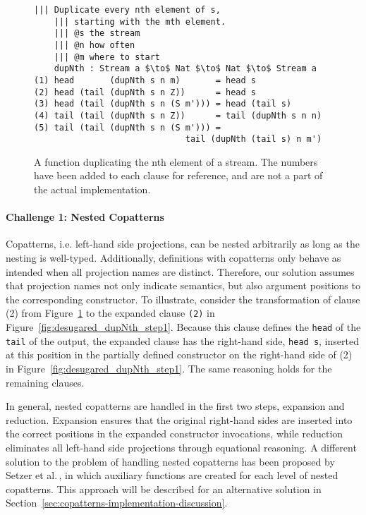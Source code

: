 \begin{figure}[H]
\begin{lstlisting}[mathescape,title=\idrisBlock]
    ||| Duplicate every nth element of s, 
    ||| starting with the mth element.
    ||| @s the stream
    ||| @n how often
    ||| @m where to start
    dupNth : Stream a $\to$ Nat $\to$ Nat $\to$ Stream a
(1) head       (dupNth s n m)       = head s
(2) head (tail (dupNth s n Z))      = head s
(3) head (tail (dupNth s n (S m'))) = head (tail s)
(4) tail (tail (dupNth s n Z))      = tail (dupNth s n n)
(5) tail (tail (dupNth s n (S m'))) = 
                              tail (dupNth (tail s) n m')
\end{lstlisting}
  \caption{A function duplicating the nth element of a stream. The numbers have been
  added to each clause for reference, and are not a part of the actual implementation.}
  \label{fig:dupNth}
\end{figure}

\paragraph{Challenge 1: Nested Copatterns}
Copatterns, i.e. left-hand side projections, can be nested arbitrarily as long
as the nesting is well-typed. Additionally, definitions with copatterns only behave
as intended when all projection names are distinct. Therefore, our solution
assumes that projection names not only indicate semantics, but also argument
positions to the corresponding constructor. To illustrate, consider the
transformation of clause (2) from Figure~\ref{fig:dupNth} to the expanded clause
\texttt{(2)} in Figure~\ref{fig:desugared_dupNth_step1}. Because this clause
defines the \texttt{head} of the \texttt{tail} of the output, the expanded
clause has the right-hand side, \texttt{head~s}, inserted at this position in
the partially defined constructor on the right-hand side of (2) in
Figure~\ref{fig:desugared_dupNth_step1}. The same reasoning holds for the remaining clauses.

In general, nested copatterns are handled in the first two steps, expansion and
reduction. Expansion ensures that the original right-hand sides are inserted
into the correct positions in the expanded constructor invocations, while
reduction eliminates all left-hand side projections through equational
reasoning. A different solution to the problem of handling nested copatterns has
been proposed by Setzer et al.\,\citep{Setzer14Unnesting}, in which auxiliary
functions are created for each level of nested copatterns. This approach will be
described for an alternative solution in
Section~\ref{sec:copatterns-implementation-discussion}.

